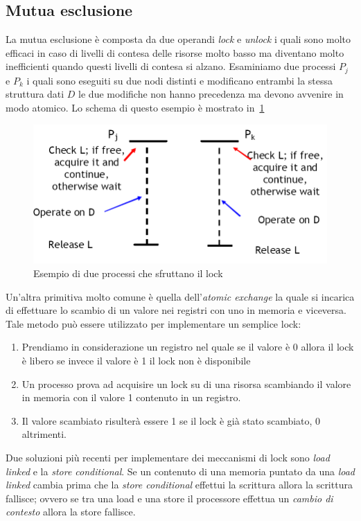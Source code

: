 \subsection{Mutua esclusione}
La mutua esclusione è composta da due operandi \emph{lock} e \emph{unlock} i quali sono molto efficaci in caso di livelli di contesa delle risorse molto basso ma diventano molto inefficienti quando questi livelli di contesa si alzano. Esaminiamo due processi $P_j$ e $P_k$ i quali sono eseguiti su due nodi distinti e modificano entrambi la stessa struttura dati $D$ le due modifiche non hanno precedenza ma devono avvenire in modo atomico. Lo schema di questo esempio è mostrato in \figurename\,\ref{fig:lockexemp}
\begin{figure}[htb]
\centering
\includegraphics[scale=0.5]{img/lockexemp.png}
\caption{Esempio di due processi che sfruttano il lock}\label{fig:lockexemp}
\end{figure}
Un'altra primitiva molto comune è quella dell'\emph{atomic exchange} la quale si incarica di effettuare lo scambio di un valore nei registri con uno in memoria e viceversa. Tale metodo può essere utilizzato per implementare un semplice lock:
\begin{enumerate}
\item Prendiamo in considerazione un registro nel quale se il valore è 0 allora il lock è libero se invece il valore è 1 il lock non è disponibile
\item Un processo prova ad acquisire un lock su di una risorsa scambiando il valore in memoria con il valore 1 contenuto in un registro.
\item Il valore scambiato risulterà essere 1 se il lock è già stato scambiato, 0 altrimenti.
\end{enumerate}
Due soluzioni più recenti per implementare dei meccanismi di lock sono \emph{load linked} e la \emph{store conditional}. Se un contenuto di una memoria puntato da una \emph{load linked} cambia prima che la \emph{store conditional} effettui la scrittura allora la scrittura fallisce; ovvero se tra una load e una store il processore effettua un \emph{cambio di contesto} allora la store fallisce.

